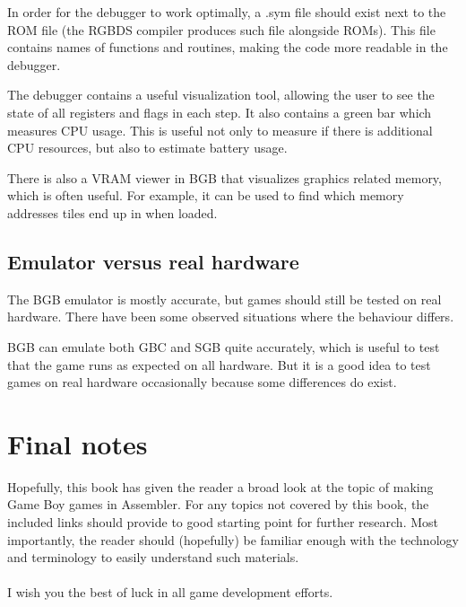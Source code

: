 \documentclass[11pt]{book}
\begin{document}
In order for the debugger to work optimally, a .sym file should exist next to the ROM file (the RGBDS compiler produces such file alongside ROMs). This file contains names of functions and routines, making the code more readable in the debugger.

The debugger contains a useful visualization tool, allowing the user to see the state of all registers and flags in each step. It also contains a green bar which measures CPU usage. This is useful not only to measure if there is additional CPU resources, but also to estimate battery usage.

There is also a VRAM viewer in BGB that visualizes graphics related memory, which is often useful. For example, it can be used to find which memory addresses tiles end up in when loaded.

\section{Emulator versus real hardware} 
The BGB emulator is mostly accurate, but games should still be tested on real hardware. There have been some observed situations where the behaviour differs. 

BGB can emulate both GBC and SGB quite accurately, which is useful to test that the game runs as expected on all hardware. But it is a good idea to test games on real hardware occasionally because some differences do exist.

\chapter{Final notes}
Hopefully, this book has given the reader a broad look at the topic of making Game Boy games in Assembler. For any topics not covered by this book, the included links should provide to good starting point for further research. Most importantly, the reader should (hopefully) be familiar enough with the technology and terminology to easily understand such materials.
~\\
~\\
\noindent I wish you the best of luck in all game development efforts. 
\end{document}
